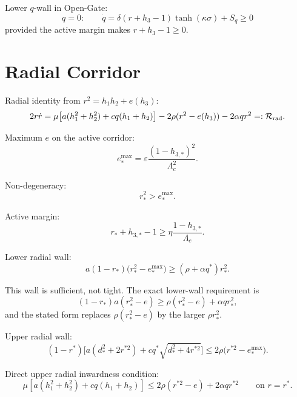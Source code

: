 \documentclass[11pt,a4paper]{article}
\newcommand{\Rcal}{\mathcal R}
\theoremstyle{remark}
\begin{document}
Lower $q$-wall in Open-Gate:
\begin{equation}
  q=0:
  \qquad
  \dot q=\delta(r+h_3-1)\tanh(\kappa\sigma)+S_q\ge0
\end{equation}
provided the active margin makes $r+h_3-1\ge0$.

\section{Radial Corridor}

Radial identity from $r^2=h_1h_2+e(h_3)$:
\begin{equation}
  2r\dot r=
  \mu\bigl[a(h_1^2+h_2^2)+cq(h_1+h_2)\bigr]
  -2\rho(r^2-e(h_3))-2\alpha q r^2
  =:\Rcal_{\rm rad}.
\end{equation}

Maximum $e$ on the active corridor:
\begin{equation}
  e_*^{\max}=\varepsilon\frac{(1-h_{3,*})^2}{\Lambda_c^2}.
\end{equation}

Non-degeneracy:
\begin{equation}
  r_*^2>e_*^{\max}.
\end{equation}

Active margin:
\begin{equation}
  r_*+h_{3,*}-1\ge \eta\frac{1-h_{3,*}}{\Lambda_c}.
\end{equation}

Lower radial wall:
\begin{equation}
  a(1-r_*)\bigl(r_*^2-e_*^{\max}\bigr)
  \ge (\rho+\alpha q^*)r_*^2.
\end{equation}

This wall is sufficient, not tight. The exact lower-wall requirement is
\begin{equation}
  (1-r_*)a(r_*^2-e)
  \ge
  \rho(r_*^2-e)+\alpha q r_*^2,
\end{equation}
and the stated form replaces \(\rho(r_*^2-e)\) by the larger \(\rho r_*^2\).

Upper radial wall:
\begin{equation}
  (1-r^*)\bigl[a(d_*^2+2r^{*2})+cq^*\sqrt{d_*^2+4r^{*2}}\bigr]
  \le 2\rho\bigl(r^{*2}-e_*^{\max}\bigr).
\end{equation}

Direct upper radial inwardness condition:
\begin{equation}
  \mu\left[a(h_1^2+h_2^2)+cq(h_1+h_2)\right]
  \le 2\rho(r^{*2}-e)+2\alpha q r^{*2}
  \qquad\text{on } r=r^*.
\end{equation}
\end{document}
